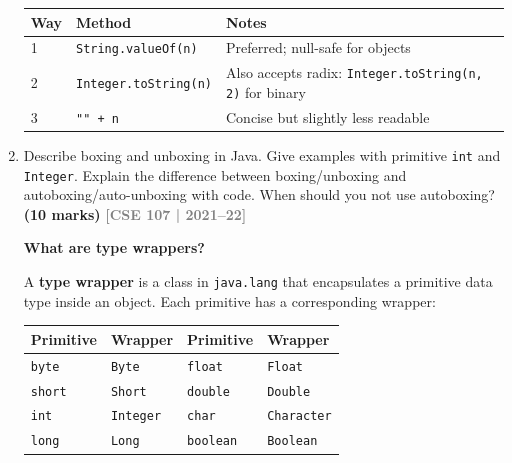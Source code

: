 \documentclass[12pt,a3paper]{article}
\newcommand{\yr}[1]{\hfill\textcolor{gray}{\small\textbf{[#1]}}}
\newcommand{\mk}[1]{\textcolor{orange!70!black}{\small\textbf{(#1 marks)}}}
\begin{document}
\begin{enumerate}
\begin{tcolorbox}
\begin{center}
\small
\begin{tabularx}{\linewidth}{@{}llX@{}}
\toprule
\textbf{Way} & \textbf{Method} & \textbf{Notes} \\
\midrule
1 & \texttt{String.valueOf(n)}   & Preferred; null-safe for objects \\
2 & \texttt{Integer.toString(n)} & Also accepts radix: \texttt{Integer.toString(n, 2)} for binary \\
3 & \texttt{"" + n}              & Concise but slightly less readable \\
\bottomrule
\end{tabularx}
\end{center}

\end{tcolorbox}

\item Describe boxing and unboxing in Java. Give examples with primitive \texttt{int} and \texttt{Integer}. Explain the difference between boxing/unboxing and autoboxing/auto-unboxing with code. When should you not use autoboxing? \mk{10}
\yr{CSE 107 | 2021--22}

\begin{tcolorbox}[enhanced,breakable,ansbox,
  colback=cB!4,colframe=cB,boxrule=0.8pt,arc=5pt,
  title={\textbf{Answer --- Type Wrappers, Autoboxing \& Auto-Unboxing}},
  fonttitle=\bfseries\color{white},colbacktitle=cB]

\textbf{What are type wrappers?}

A \textbf{type wrapper} is a class in \texttt{java.lang} that
encapsulates a primitive data type inside an object.  Each primitive
has a corresponding wrapper:

\begin{center}
\small
\begin{tabular}{@{}ll@{\qquad}ll@{}}
\toprule
\textbf{Primitive} & \textbf{Wrapper} & \textbf{Primitive} & \textbf{Wrapper} \\
\midrule
\texttt{byte}    & \texttt{Byte}    &
\texttt{float}   & \texttt{Float}   \\
\texttt{short}   & \texttt{Short}   &
\texttt{double}  & \texttt{Double}  \\
\texttt{int}     & \texttt{Integer} &
\texttt{char}    & \texttt{Character} \\
\texttt{long}    & \texttt{Long}    &
\texttt{boolean} & \texttt{Boolean} \\
\bottomrule
\end{tabular}
\end{center}


\end{tcolorbox}
\end{enumerate}
\end{document}
